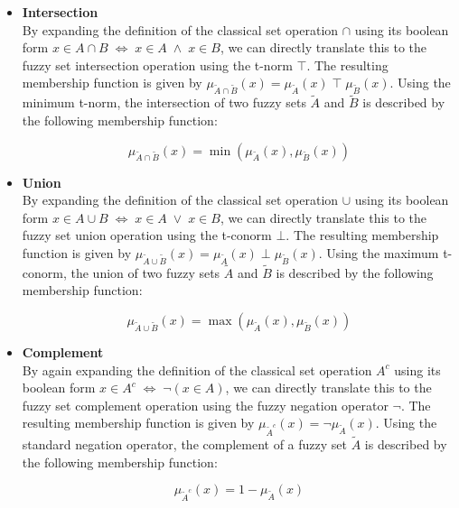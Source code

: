 \begin{itemize}

      \item \textbf{Intersection} \\
            By expanding the definition of the classical set operation $\cap$ using its boolean form $x \in A \cap B \; \iff \; x \in A \; \land \; x \in B$, we can directly translate this to the fuzzy set intersection operation using the t-norm $\top$. The resulting membership function is given by $\mu_{\tilde{A} \cap \tilde{B}}(x) = \mu_{\tilde{A}}(x) \; \top \; \mu_{\tilde{B}}(x)$. Using the minimum t-norm, the intersection of two fuzzy sets $\tilde{A}$ and $\tilde{B}$ is described by the following membership function:

            \begin{equation*}
                  \mu_{\tilde{A} \cap \tilde{B}}(x) = \min(\mu_{\tilde{A}}(x), \mu_{\tilde{B}}(x))
            \end{equation*}


      \item \textbf{Union} \\
            By expanding the definition of the classical set operation $\cup$ using its boolean form $x \in A \cup B \; \iff \; x \in A \; \lor \; x \in B$, we can directly translate this to the fuzzy set union operation using the t-conorm $\bot$. The resulting membership function is given by $\mu_{\tilde{A} \cup \tilde{B}}(x) = \mu_{\tilde{A}}(x) \;\bot \; \mu_{\tilde{B}}(x)$. Using the maximum t-conorm, the union of two fuzzy sets $\tilde{A}$ and $\tilde{B}$ is described by the following membership function:

            \begin{equation*}
                  \mu_{\tilde{A} \cup \tilde{B}}(x) = \max(\mu_{\tilde{A}}(x), \mu_{\tilde{B}}(x))
            \end{equation*}

      \item \textbf{Complement} \\
            By again expanding the definition of the classical set operation $A^c$ using its boolean form $x \in A^c \; \iff \; \neg (x \in A)$, we can directly translate this to the fuzzy set complement operation using the fuzzy negation operator $\neg$. The resulting membership function is given by $\mu_{ \tilde{A}^c}(x) = \neg \mu_{\tilde{A}}(x)$. Using the standard negation operator, the complement of a fuzzy set $\tilde{A}$ is described by the following membership function:

            \begin{equation*}
                  \mu_{ \tilde{A}^c}(x) = 1 - \mu_{\tilde{A}}(x)
            \end{equation*}
\end{itemize}


